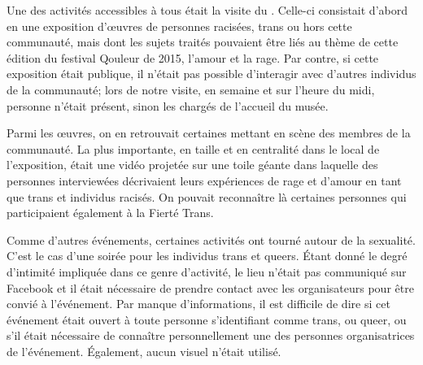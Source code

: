 Une des activités accessibles à tous était la visite du \mai{}.
Celle-ci consistait d'abord en une exposition d'œuvres de personnes racisées, trans ou hors cette communauté, mais dont les sujets traités pouvaient être liés au thème de cette édition du festival Qouleur de 2015, l'amour et la rage.
Par contre, si cette exposition était publique, il n'était pas possible d'interagir avec d'autres individus de la communauté; lors de notre visite, en semaine et sur l'heure du midi, personne n'était présent, sinon les chargés de l'accueil du musée.

Parmi les œuvres, on en retrouvait certaines mettant en scène des membres de la communauté.
La plus importante, en taille et en centralité dans le local de l'exposition, était une vidéo projetée sur une toile géante dans laquelle des personnes interviewées décrivaient leurs expériences de rage et d'amour en tant que trans et individus racisés.
On pouvait reconnaître là certaines personnes qui participaient également à la Fierté Trans.

Comme d'autres événements, certaines activités ont tourné autour de la sexualité.
C'est le cas d'une soirée \bdsm{} pour les individus trans et queers.
Étant donné le degré d'intimité impliquée dans ce genre d'activité, le lieu n'était pas communiqué sur Facebook et il était nécessaire de prendre contact avec les organisateurs pour être convié à l'événement.
Par manque d'informations, il est difficile de dire si cet événement était ouvert à toute personne s'identifiant comme trans, ou queer, ou s’il était nécessaire de connaître personnellement une des personnes organisatrices de l'événement.
Également, aucun visuel n'était utilisé.


